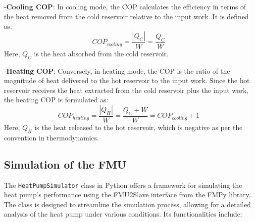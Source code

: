 \documentclass{report}
\begin{document}
\begin{itemize}
    -\textbf{Cooling COP}:
       In cooling mode, the COP calculates the efficiency in terms of the heat removed from the cold reservoir relative to the input work. It is defined as:
       \begin{equation}
           COP_{cooling} = \frac{|Q_C|}{W} = \frac{Q_C}{W}
       \end{equation}
       Here, \( Q_C \) is the heat absorbed from the cold reservoir.
    
    -\textbf{Heating COP}:
       Conversely, in heating mode, the COP is the ratio of the magnitude of heat delivered to the hot reservoir to the input work. Since the hot reservoir receives the heat extracted from the cold reservoir plus the input work, the heating COP is formulated as:
       \begin{equation}
           COP_{heating} = \frac{|Q_H|}{W} = \frac{Q_C + W}{W} = COP_{cooling} + 1
       \end{equation}
       Here, \( Q_H \) is the heat released to the hot reservoir, which is negative as per the convention in thermodynamics.
    
 
\end{itemize}

\subsection{Simulation of the FMU}
The \texttt{HeatPumpSimulator} class in Python offers a  framework for simulating the heat pump's performance using the FMU2Slave interface from the FMPy library. The class is designed to streamline the simulation process, allowing for a detailed analysis of the heat pump under various conditions. Its functionalities include:
\end{document}
